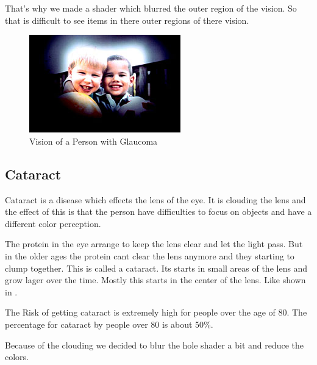 \documentclass{sig-alternate-05-2015}
\begin{document}
That's why we made a shader which blurred the outer region of the vision. So that is difficult to see items in there outer regions of there vision.

\begin{figure}
    \centering
    \includegraphics[width=\columnwidth]{glaucomavision.png}
    \caption{Vision of a Person with Glaucoma}
    \label{fig:glaucoma}
\end{figure}

\subsection{Cataract}

Cataract is a disease which effects the lens of the eye. It is clouding the lens and the effect of this is that the person have difficulties to focus on objects and have a different color perception.

The protein in the eye arrange to keep the lens clear and let the light pass. But in the older ages the protein cant clear the lens anymore and they starting to clump together. This is called a cataract. Its starts in small areas of the lens and grow lager over the time. Mostly this starts in the center of the lens. Like shown in .

The Risk of getting cataract is extremely high for people over the age of 80. The percentage for cataract by people over 80 is about 50\%.~\cite{cataractfacts}

Because of the clouding we decided to blur the hole shader a bit and reduce the colors.
\end{document}
